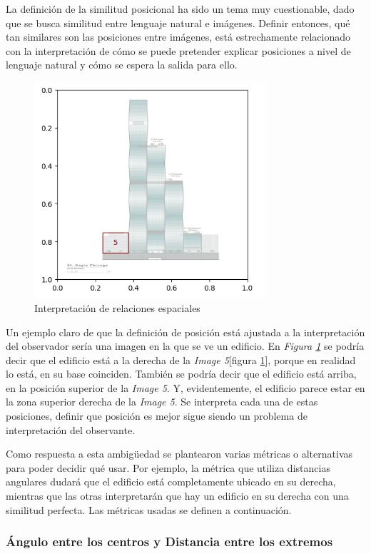 La definición de la similitud posicional ha sido un tema muy cuestionable, dado que se busca similitud entre lenguaje natural e imágenes. Definir entonces, qu\'e tan similares son las posiciones entre imágenes, está estrechamente relacionado con la interpretación de cómo se puede pretender explicar posiciones a nivel de lenguaje natural y cómo se espera la salida para ello.

\begin{figure}[H]
\centering
\includegraphics[height=80mm]{Graphics/building.png}
\caption{Interpretaci\'on de relaciones espaciales}
\label{fig:edificio}
\end{figure}

Un ejemplo claro de que la definición de posición está ajustada a la interpretación del observador sería una imagen en la que se ve un edificio. En \textit{Figura \ref{fig:edificio}} se podría decir que el edificio está a la derecha de la \textit{Image 5}[figura \ref{fig:edificio}], porque en realidad lo está, en su base coinciden. También se podría decir que el edificio está arriba, en la posición superior de la \textit{Image 5}. Y, evidentemente, el edificio parece estar en la zona superior derecha de la \textit{Image 5}. Se interpreta cada una de estas posiciones, definir que posici\'on es mejor sigue siendo un problema de interpretaci\'on del observante.

Como respuesta a esta ambigüedad se plantearon varias métricas o alternativas para poder decidir qué usar. Por ejemplo, la métrica que utiliza distancias angulares dudará que el edificio está completamente ubicado en su derecha, mientras que las otras interpretarán que hay un edificio en su derecha con una similitud perfecta. Las métricas usadas se definen a continuación.

\subsubsection{Ángulo entre los centros y Distancia entre los extremos}

